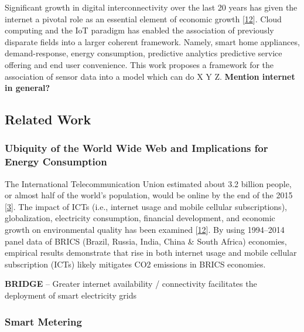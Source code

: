 \documentclass[11pt,]{article}
\begin{document}
Significant growth in digital interconnectivity over the last 20 years
has given the internet a pivotal role as an essential element of
economic growth
{[}\protect\hyperlink{ref-haseebDoesInformationCommunication2019}{12}{]}.
Cloud computing and the IoT paradigm has enabled the association of
previously disparate fields into a larger coherent framework. Namely,
smart home appliances, demand-response, energy consumption, predictive
analytics predictive service offering and end user convenience. This
work proposes a framework for the association of sensor data into a
model which can do X Y Z. \textbf{Mention internet in general?}

\hypertarget{related-work}{%
\subsection{Related Work}\label{related-work}}

\hypertarget{ubiquity-of-the-world-wide-web-and-implications-for-energy-consumption}{%
\subsubsection{Ubiquity of the World Wide Web and Implications for
Energy
Consumption}\label{ubiquity-of-the-world-wide-web-and-implications-for-energy-consumption}}

The International Telecommunication Union estimated about 3.2 billion
people, or almost half of the world's population, would be online by the
end of the 2015
{[}\protect\hyperlink{ref-InformationCommunicationTechnologies}{3}{]}.
The impact of ICTs (i.e., internet usage and mobile cellular
subscriptions), globalization, electricity consumption, financial
development, and economic growth on environmental quality has been
examined
{[}\protect\hyperlink{ref-haseebDoesInformationCommunication2019}{12}{]}.
By using 1994--2014 panel data of BRICS (Brazil, Russia, India, China \&
South Africa) economies, empirical results demonstrate that rise in both
internet usage and mobile cellular subscription (ICTs) likely mitigates
CO2 emissions in BRICS economies.

\textbf{BRIDGE} -- Greater internet availability / connectivity
facilitates the deployment of smart electricity grids

\hypertarget{smart-metering}{%
\subsubsection{Smart Metering}\label{smart-metering}}
\end{document}
